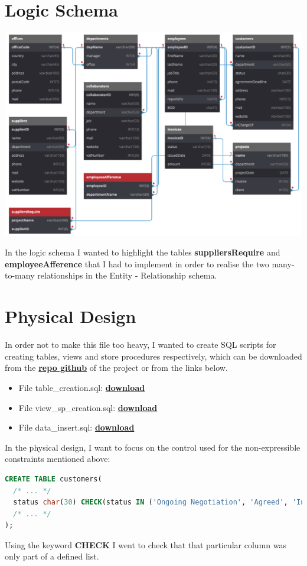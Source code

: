 \documentclass[12pt,a4paper]{article}
\begin{document}
\section{Logic Schema}\label{sec:logic-schema}
\begin{center}
\includegraphics[width=0.9\columnwidth]{../../img/logic_scheme}
\end{center}
In the logic schema I wanted to highlight the tables \textbf{suppliersRequire} and \textbf{employeeAfference} that I had to implement in order to realise the two many-to-many relationships in the Entity - Relationship schema.


\clearpage
\section{Physical Design}\label{sec:physical-design}
In order not to make this file too heavy, I wanted to create SQL scripts for creating tables, views and store procedures respectively, which can be downloaded from the \href{https://github.com/enricolacchin/database-2023-final-project/}{\textbf{repo github}} of the project or from the links below.
\begin{itemize}
\item File table\_creation.sql: \href{https://github.com/enricolacchin/database-2023-final-project/SQL/table_creation.sql}{\textbf{download}}
\item File view\_sp\_creation.sql: \href{https://github.com/enricolacchin/database-2023-final-project/SQL/view_sp_creation.sql}{\textbf{download}}
\item File data\_insert.sql: \href{https://github.com/enricolacchin/database-2023-final-project/SQL/data_insert.sql}{\textbf{download}}
\end{itemize}
In the physical design, I want to focus on the control used for the non-expressible constraints mentioned above:
\flushleft
\begin{lstlisting}[language = SQL,label={lst:check}]
CREATE TABLE customers(
  /* ... */
  status char(30) CHECK(status IN ('Ongoing Negotiation', 'Agreed', 'In Progress', 'Done')),
  /* ... */
);
\end{lstlisting}
Using the keyword \textbf{CHECK} I went to check that that particular column was only part of a defined list.
\end{document}
